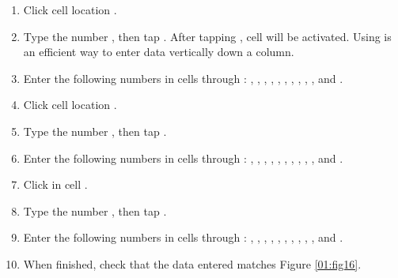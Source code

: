 \begin{enumbox}
	\begin{enumerate}
		\item Click cell location .
		\item Type the number , then tap . After tapping , cell  will be activated. Using  is an efficient way to enter data vertically down a column.
		\item Enter the following numbers in cells  through : , , , , , , , , , , and .
		\item Click cell location .
		\item Type the number , then tap .
		\item Enter the following numbers in cells  through : , , , , , , , , , , and .
		\item Click in cell .
		\item Type the number , then tap .
		\item Enter the following numbers in cells  through : , , , , , , , , , , and .
		\item When finished, check that the data entered matches Figure \ref{01:fig16}.
	\end{enumerate}
\end{enumbox}
	
